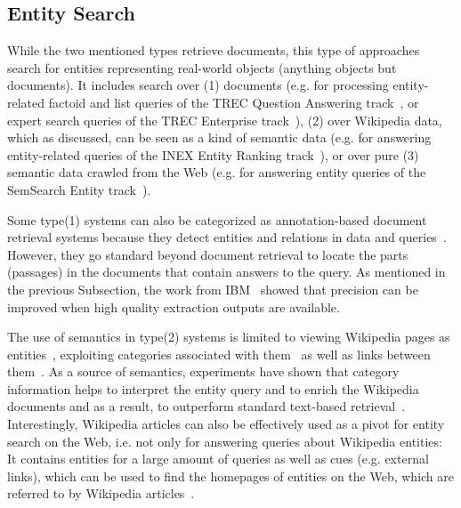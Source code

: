 \subsection{Entity Search} While the two mentioned types retrieve documents, this type of approaches search for entities representing real-world objects (anything objects but documents). It includes search over (1) documents (e.g. for processing entity-related factoid and list queries of the TREC Question Answering track~\cite{DBLP:conf/sigir/Chu-CarrollPCFD06}, or expert search queries of the TREC Enterprise track~\cite{DBLP:journals/ipm/BalogAR09}),  (2) over 
Wikipedia data, which as discussed, can be seen as a kind of semantic data (e.g. for answering entity-related queries of the INEX Entity Ranking track~\cite{DBLP:conf/cikm/KapteinSVK10,DBLP:conf/ecir/PehcevskiVT08}), or over pure (3) semantic data crawled from the Web (e.g. for answering entity queries of the SemSearch Entity track~\cite{DBLP:conf/semweb/BlancoMV11}).  




Some type(1) systems can also be categorized as annotation-based document retrieval systems because they detect entities and relations in data and queries~\cite{DBLP:conf/vldb/ChengYC07,DBLP:conf/www/NieMSWM07,DBLP:conf/sigir/Chu-CarrollPCFD06}. However, they go standard beyond document retrieval to locate the parts (passages) in the documents that contain answers to the query. As mentioned in the previous Subsection, the work from IBM~\cite{DBLP:conf/sigir/Chu-CarrollPCFD06} showed that precision can be improved when high quality extraction outputs are available. 

The use of semantics in type(2) systems is limited to viewing Wikipedia pages as entities~\cite{DBLP:conf/cikm/KapteinSVK10}, exploiting categories associated with them~\cite{DBLP:journals/tois/BalogBR11} as well as links between them~\cite{DBLP:conf/ecir/PehcevskiVT08}. As a source of semantics, experiments have shown that category information helps to interpret the entity query and to enrich the Wikipedia documents and as a result, to outperform standard text-based retrieval~\cite{DBLP:conf/cikm/KapteinSVK10,DBLP:journals/tois/BalogBR11}. Interestingly, 
Wikipedia articles can also be effectively used as a pivot for entity search on the Web, i.e. not only for answering queries about Wikipedia entities: It contains entities for a large amount of queries as well as cues (e.g. external links), which can be used to find the homepages of entities on the Web, which are referred to by Wikipedia articles~\cite{DBLP:conf/cikm/KapteinSVK10}. 

